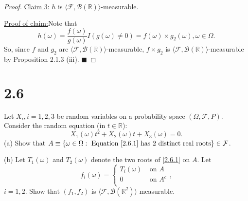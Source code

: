 \documentclass[12pt]{article}
\newenvironment{claimproof}[1]{\par\noindent\underline{Proof of claim:}\space#1}{\hfill $\blacksquare$}
\begin{document}
\begin{proof}
\underline{Claim 3:} $h$ is $\langle\mathcal{F}, \mathcal{B}(\mathbb{R})\rangle$-measurable.

\begin{claimproof}
Note that 
\[ h(\omega) = \frac{f(\omega)}{g(\omega)}I(g(\omega)\neq 0) = f(\omega)\times g_{2}(\omega), \omega \in \Omega. \]
So, since $f$ and $g_{2}$ are $\langle\mathcal{F}, \mathcal{B}(\mathbb{R})\rangle$-measurable, $f\times g_{2}$ is $\langle\mathcal{F},
\mathcal{B}(\mathbb{R})\rangle$-measurable by Proposition 2.1.3 (iii).
\end{claimproof}

\end{proof}

\newpage
\section*{2.6}
Let $X_{i}, i = 1,2,3$ be random variables on a probability space $(\Omega, \mathcal{F}, P)$. Consider the random equation (in $t \in \mathbb{R}$):
\begin{equation}
X_{1}(\omega)t^{2} + X_{2}(\omega)t + X_{3}(\omega) = 0. 
\label{2.6.1}
\end{equation}
(a) Show that $A \equiv \left\{ \omega \in \Omega : \text{ Equation \ref{2.6.1} has 2 distinct real roots} \right\} \in \mathcal{F}$.

(b) Let $T_{1}(\omega)$ and $T_{2}(\omega)$ denote the two roots of \ref{2.6.1} on $A$. Let 
\[ f_{i}(\omega) = \left\{ \begin{array}{cl}
T_{i}(\omega) & \text{ on } A \\
0 & \text{ on }A^{c} \\
\end{array} \right., \]
$i = 1,2$. Show that $(f_{1}, f_{2})$ is $\langle\mathcal{F}, \mathcal{B}(\mathbb{R}^{2})\rangle$-measurable.
\end{document}
